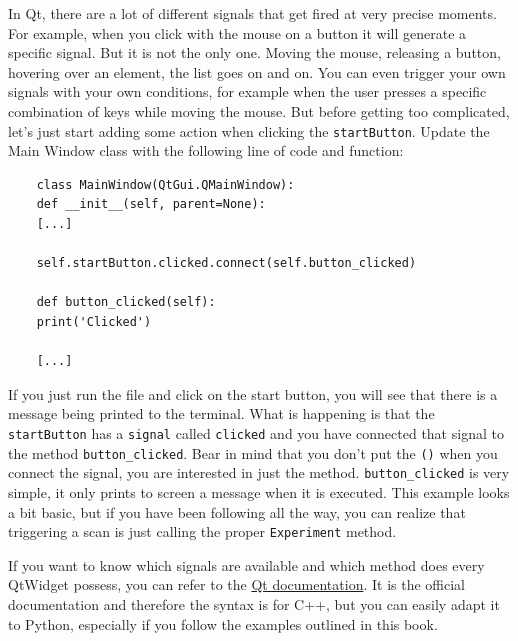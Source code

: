 In Qt, there are a lot of different signals that get fired at very
precise moments. For example, when you click with the mouse on a button
it will generate a specific signal. But it is not the only one. Moving
the mouse, releasing a button, hovering over an element, the list goes
on and on. You can even trigger your own signals with your own
conditions, for example when the user presses a specific combination of
keys while moving the mouse. But before getting too complicated, let's
just start adding some action when clicking the \texttt{startButton}.
Update the Main Window class with the following line of code and
function:

\begin{verbatim}
    class MainWindow(QtGui.QMainWindow):
    def __init__(self, parent=None):
    [...]

    self.startButton.clicked.connect(self.button_clicked)

    def button_clicked(self):
    print('Clicked')

    [...]
\end{verbatim}

If you just run the file and click on the start button, you will see
that there is a message being printed to the terminal. What is happening
is that the \texttt{startButton} has a \texttt{signal} called
\texttt{clicked} and you have connected that signal to the method
\texttt{button_clicked}. Bear in mind that you don't put the
\texttt{()} when you connect the signal, you are interested in just the
method. \texttt{button_clicked} is very simple, it only prints to
screen a message when it is executed. This example looks a bit basic,
but if you have been following all the way, you can realize that
triggering a scan is just calling the proper \texttt{Experiment} method.


If you want to know which signals are available and which method does
every QtWidget possess, you can refer to the
\href{http://doc.qt.io/qt-5/qtwidgets-module.html}{Qt documentation}. It
is the official documentation and therefore the syntax is for C++, but
you can easily adapt it to Python, especially if you follow the examples
outlined in this book.


